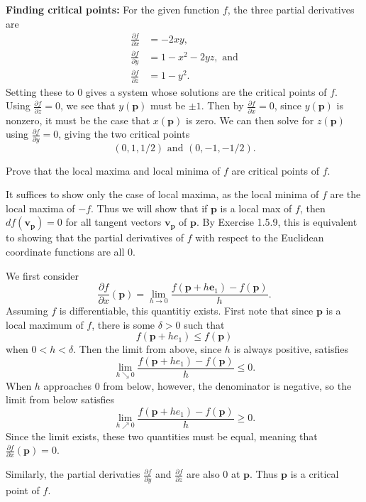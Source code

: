 \documentclass[10pt]{report}
\begin{document}
\textbf{Finding critical points:} For the given function $f$, the three partial derivatives are
\begin{align*}
	\frac{\partial f}{\partial x} &= -2xy, \\
	\frac{\partial f}{\partial y} &= 1-x^2-2yz, \text{ and} \\
	\frac{\partial f}{\partial z} &= 1-y^2.
\end{align*}
Setting these to 0 gives a system whose solutions are the critical points of $f$. Using $\frac{\partial f}{\partial z} = 0$, we see that $y(\mathbf{p})$ must be $\pm 1$. Then by $\frac{\partial f}{\partial x} =0$, since $y(\mathbf{p})$ is nonzero, it must be the case that $x(\mathbf{p})$ is zero. We can then solve for $z(\mathbf{p})$ using $\frac{\partial f}{\partial y} =0$, giving the two critical points
\[
	(0, 1, 1/2) \text{ and } (0, -1, -1/2).
\] 


\begin{exer}[1.5.10]
	Prove that the local maxima and local minima of $f$ are critical points of $f$.
\end{exer}
It suffices to show only the case of local maxima, as the local minima of $f$ are the local maxima of $-f$. Thus we will show that if $\mathbf{p}$ is a local max of $f$, then $df(\mathbf{v}_{\mathbf{p}})=0$ for all tangent vectors $\mathbf{v}_\mathbf{p}$ of $\mathbf{p}$. By Exercise 1.5.9, this is equivalent to showing that the partial derivatives of $f$ with respect to the Euclidean coordinate functions are all 0.

We first consider
\[
	\frac{\partial f}{\partial x} (\mathbf{p}) = \lim_{h \to 0} \frac{f(\mathbf{p}+h\mathbf{e}_1)-f(\mathbf{p})}{h} .
\] Assuming $f$ is differentiable, this quantitiy exists. First note that since $\mathbf{p}$ is a local maximum of $f$, there is some $\delta>0$ such that
\[
	f(\mathbf{p}+he_1) \leq f(\mathbf{p})
\] when $0 < h < \delta.$ Then the limit from above, since $h$ is always positive, satisfies
\[
\lim_{h \searrow 0} \frac{f(\mathbf{p}+he_1)-f(\mathbf{p})}{h} \leq 0.
\] When $h$ approaches $0$ from below, however, the denominator is negative, so the limit from below satisfies
\[
\lim_{h \nearrow 0} \frac{f(\mathbf{p}+he_1)-f(\mathbf{p})}{h} \geq 0.
\] Since the limit exists, these two quantities must be equal, meaning that $\frac{\partial f}{\partial x} (\mathbf{p})=0$.

Similarly, the partial derivaties $\frac{\partial f}{\partial y} $ and $\frac{\partial f}{\partial z} $ are also 0 at $\mathbf{p}$. Thus $\mathbf{p}$ is a critical point of $f$.
\end{document}
